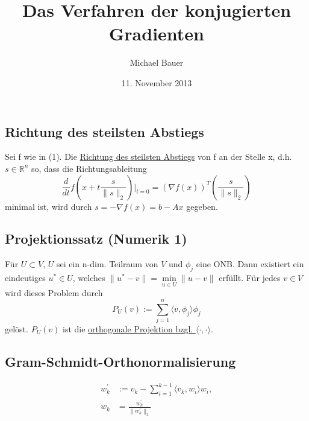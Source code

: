 \documentclass{article}
\title{Das Verfahren der konjugierten Gradienten}
\author{Michael Bauer}
\date{11. November 2013}
\begin{document}
\maketitle
\Large

\section*{}

\subsection*{Richtung des steilsten Abstiegs}
Sei f wie in (1). Die \underline{Richtung des steilsten Abstiegs} von f an der Stelle x, d.h. $s\in\mathbb{R}^{n}$ so, dass die Richtungsableitung
\begin{equation}
\frac d {dt} f(x+t\frac s {\|s\|_{2}})|_{t=0} = (\nabla f(x))^{T} (\frac s {\|s\|_{2}})
\end{equation}
minimal ist, wird durch $s = -\nabla f(x) = b - Ax$ gegeben.

\subsection*{Projektionssatz (Numerik 1)}
Für $U \subset V$, $U$ sei ein n-dim. Teilraum von $V$ und $\phi_{j}$ eine ONB. Dann existiert ein eindeutiges $u^{*} \in U$, welches $\|u^{*} - v\| = \underset{u \in U}{\min} \|u - v\|$ erfüllt. Für jedes $v \in V$ wird dieses Problem durch
\begin{equation}
P_{U}(v) := \sum_{j=1}^{n} \langle v, \phi_{j} \rangle \phi_{j}
\end{equation}
gelöst. $P_{U}(v)$ ist die \underline{orthogonale Projektion bzgl. $\langle \cdot, \cdot \rangle$}.

\subsection*{Gram-Schmidt-Orthonormalisierung}
\begin{align*}
	w_{k}^{'} &:= v_{k} - \sum_{i=1}^{k-1} \langle v_{k}, w_{i} \rangle w_{i}, \\
	w_{k} &= \frac {w_{k}^{'}} {\|w_{k}^{'}\|_{2}}
\end{align*}
\end{document}
